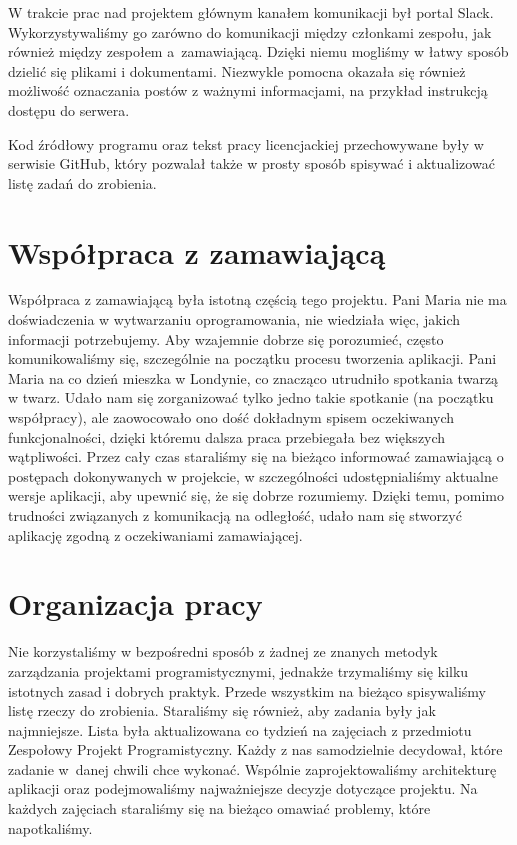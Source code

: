 \documentclass[licencjacka]{pracamgr}
\begin{document}
W trakcie prac nad projektem głównym kanałem komunikacji był portal Slack. Wykorzystywaliśmy go zarówno do komunikacji między członkami zespołu, jak również między zespołem a~zamawiającą. Dzięki niemu mogliśmy w łatwy sposób dzielić się plikami i dokumentami. Niezwykle pomocna okazała się również możliwość oznaczania postów z ważnymi informacjami, na przykład instrukcją dostępu do serwera.

Kod źródłowy programu oraz tekst pracy licencjackiej przechowywane były w serwisie \mbox{GitHub}, który pozwalał także w prosty sposób spisywać i aktualizować listę zadań do zrobienia.

\section{Współpraca z zamawiającą}
Współpraca z zamawiającą była istotną częścią tego projektu. Pani Maria nie ma doświadczenia w wytwarzaniu oprogramowania, nie wiedziała więc, jakich informacji potrzebujemy. Aby wzajemnie dobrze się porozumieć, często komunikowaliśmy się, szczególnie na początku procesu tworzenia aplikacji. Pani Maria na co dzień mieszka w Londynie, co znacząco utrudniło spotkania twarzą w twarz. Udało nam się zorganizować tylko jedno takie spotkanie (na początku współpracy), ale zaowocowało ono dość dokładnym spisem oczekiwanych funkcjonalności, dzięki któremu dalsza praca przebiegała bez większych wątpliwości. Przez cały czas staraliśmy się na bieżąco informować zamawiającą o postępach dokonywanych w projekcie, w szczególności udostępnialiśmy aktualne wersje aplikacji, aby upewnić się, że się dobrze rozumiemy. Dzięki temu, pomimo trudności związanych z komunikacją na odległość, udało nam się stworzyć aplikację zgodną z oczekiwaniami zamawiającej.

\section{Organizacja pracy}

Nie korzystaliśmy w bezpośredni sposób z żadnej ze znanych metodyk zarządzania projektami programistycznymi, jednakże trzymaliśmy się kilku istotnych zasad i dobrych praktyk. Przede wszystkim na bieżąco spisywaliśmy listę rzeczy do zrobienia. Staraliśmy się również, aby zadania były jak najmniejsze. Lista była aktualizowana co tydzień na zajęciach z przedmiotu Zespołowy Projekt Programistyczny. Każdy z nas samodzielnie decydował, które zadanie w~danej chwili chce wykonać. Wspólnie zaprojektowaliśmy architekturę aplikacji oraz podejmowaliśmy najważniejsze decyzje dotyczące projektu. Na każdych zajęciach staraliśmy się na bieżąco omawiać problemy, które napotkaliśmy.
\end{document}
